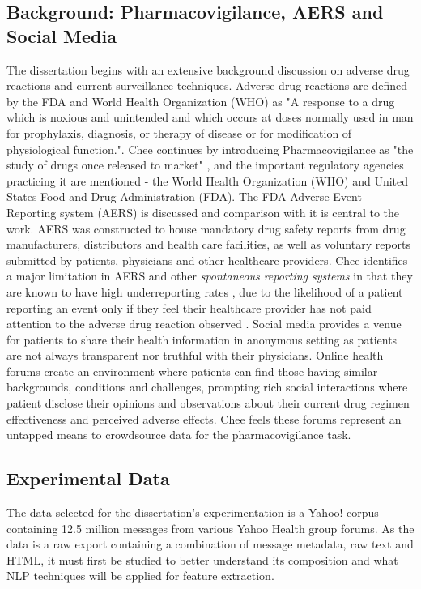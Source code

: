 \documentclass[twoside,11pt]{article}
\begin{document}
\subsection{Background: Pharmacovigilance, AERS and Social Media}
The dissertation begins with an extensive background discussion on adverse drug reactions and current surveillance techniques. Adverse drug reactions are defined by the FDA and World Health Organization (WHO) as "A response to a drug which is noxious and unintended and which occurs at doses normally used in man for prophylaxis, diagnosis, or therapy of disease or for modification of physiological function."\cite{FDA}. Chee continues by introducing Pharmacovigilance as "the study of drugs once released to market" \citep{Chee}, and the important regulatory agencies practicing it are mentioned - the World Health Organization (WHO) and United States Food and Drug Administration (FDA). The FDA Adverse Event Reporting system (AERS) is discussed and comparison with it is central to the work. AERS was constructed to house mandatory drug safety reports from drug manufacturers, distributors and health care facilities, as well as voluntary reports submitted by patients, physicians and other healthcare providers.
Chee identifies a major limitation in AERS and other \textit{spontaneous reporting systems} in that they are known to have high underreporting rates \citep{Fletcher}, due to the likelihood of a patient reporting an event only if they feel their healthcare provider has not paid attention to the adverse drug reaction observed \citep{Leamon}. Social media provides a venue for patients to share their health information in anonymous setting as patients are not always transparent nor truthful with their physicians. Online health forums create an environment where patients can find those having similar backgrounds, conditions and challenges, prompting rich social interactions where patient disclose their opinions and observations about their current drug regimen effectiveness and perceived adverse effects. Chee feels these forums represent an untapped means to crowdsource data for the pharmacovigilance task. %

\subsection{Experimental Data}
The data selected for the dissertation's experimentation is a Yahoo! corpus containing 12.5 million messages from various Yahoo Health group forums. As the data is a raw export containing a combination of message metadata, raw text and HTML, it must first be studied to better understand its composition and what NLP techniques will be applied for feature extraction. %
\end{document}
